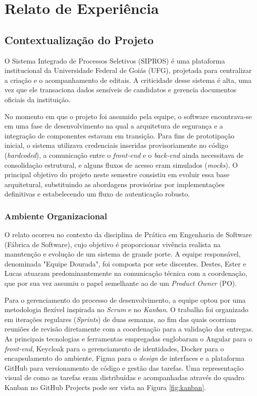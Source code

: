\chapter{Relato de Experiência}
\label{cap:relato}

\section{Contextualização do Projeto}

O Sistema Integrado de Processos Seletivos (SIPROS) é uma plataforma institucional da Universidade Federal de Goiás (UFG), projetada para centralizar a criação e o acompanhamento de editais. A criticidade desse sistema é alta, uma vez que ele transaciona dados sensíveis de candidatos e gerencia documentos oficiais da instituição.

No momento em que o projeto foi assumido pela equipe, o software encontrava-se em uma fase de desenvolvimento na qual a arquitetura de segurança e a integração de componentes estavam em transição. Para fins de prototipação inicial, o sistema utilizava credenciais inseridas provisoriamente no código (\textit{hardcoded}), a comunicação entre o \textit{front-end} e o \textit{back-end} ainda necessitava de consolidação estrutural, e alguns fluxos de acesso eram simulados (\textit{mocks}). O principal objetivo do projeto neste semestre consistiu em evoluir essa base arquitetural, substituindo as abordagens provisórias por implementações definitivas e estabelecendo um fluxo de autenticação robusto.

\subsection{Ambiente Organizacional}

O relato ocorreu no contexto da disciplina de Prática em Engenharia de Software (Fábrica de Software), cujo objetivo é proporcionar vivência realista na manutenção e evolução de um sistema de grande porte. A equipe responsável, denominada "Equipe Dourada", foi composta por sete discentes. Destes, Ester e Lucas atuaram predominantemente na comunicação técnica com a coordenação, que por sua vez assumiu o papel semelhante ao de um \textit{Product Owner} (PO).

Para o gerenciamento do processo de desenvolvimento, a equipe optou por uma metodologia flexível inspirada no \textit{Scrum} e no \textit{Kanban}. O trabalho foi organizado em iterações regulares (\textit{Sprints}) de duas semanas, ao fim das quais ocorriam reuniões de revisão diretamente com a coordenação para a validação das entregas. As principais tecnologias e ferramentas empregadas englobaram o Angular para o \textit{front-end}, Keycloak para o gerenciamento de identidades, Docker para o encapsulamento do ambiente, Figma para o \textit{design} de interfaces e a plataforma GitHub para versionamento de código e gestão das tarefas. Uma representação visual de como as tarefas eram distribuídas e acompanhadas através do quadro Kanban no GitHub Projects pode ser vista na Figura \ref{fig:kanban}.

